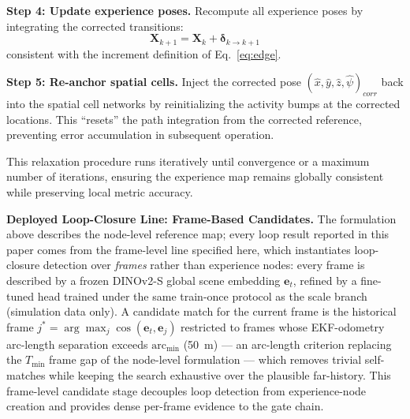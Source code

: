 \textbf{Step 4: Update experience poses.} Recompute all experience poses by integrating the corrected transitions:
\begin{equation}
    \mathbf{X}_{k+1} = \mathbf{X}_{k} + \boldsymbol{\delta}_{k \to k+1}
\end{equation}
consistent with the increment definition of Eq.~\eqref{eq:edge}.

\textbf{Step 5: Re-anchor spatial cells.} Inject the corrected pose $(\hat{x}, \hat{y}, \hat{z}, \hat{\psi})_{corr}$ back into the spatial cell networks by reinitializing the activity bumps at the corrected locations. This ``resets'' the path integration from the corrected reference, preventing error accumulation in subsequent operation.

This relaxation procedure runs iteratively until convergence or a maximum number of iterations, ensuring the experience map remains globally consistent while preserving local metric accuracy.

\textbf{Deployed Loop-Closure Line: Frame-Based Candidates.} The formulation above describes the node-level reference map; every loop result reported in this paper comes from the frame-level line specified here, which instantiates loop-closure detection over \emph{frames} rather than experience nodes: every frame is described by a frozen DINOv2-S global scene embedding $\mathbf{e}_t$, refined by a fine-tuned head trained under the same train-once protocol as the scale branch (simulation data only). A candidate match for the current frame is the historical frame $j^{*} = \arg\max_{j} \cos(\mathbf{e}_t, \mathbf{e}_j)$ restricted to frames whose EKF-odometry arc-length separation exceeds $\mathrm{arc}_{\min}$ (50~m) --- an arc-length criterion replacing the $T_{\min}$ frame gap of the node-level formulation --- which removes trivial self-matches while keeping the search exhaustive over the plausible far-history. This frame-level candidate stage decouples loop detection from experience-node creation and provides dense per-frame evidence to the gate chain.

